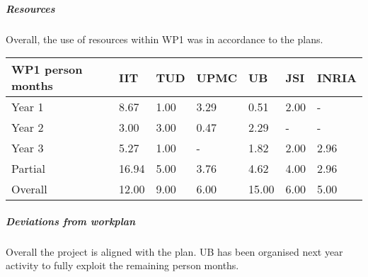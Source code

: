 

\subparagraph*{Resources}
Overall, the use of resources within WP1 was in accordance to the plans. 

\begin{center}
  \begin{tabular}{|C{1.5cm}|C{1.5cm}|C{1.5cm}|C{2cm}|C{2cm}|C{2cm}|C{2cm}|}
    \hline \footnotesize \textbf{WP1 person months}& \footnotesize
    \textbf{IIT}&\footnotesize \textbf{TUD}&\footnotesize \textbf{UPMC}&
    \footnotesize \textbf{UB} &\footnotesize \textbf{JSI} & \footnotesize \textbf{INRIA}\\
    \hline \footnotesize Year 1 & 8.67 &1.00 & 3.29 & 0.51 & 2.00 & -\\
    \hline \footnotesize Year 2 & 3.00 & 3.00 & 0.47 & 2.29 & - & - \\
    \hline \footnotesize Year 3 & 5.27 & 1.00 & - & 1.82 & 2.00 & 2.96 \\
	\hline \footnotesize Partial & 16.94 & 5.00 & 3.76 & 4.62 & 4.00 & 2.96 \\
	\hline
    \hline \footnotesize Overall & 12.00 & 9.00 & 6.00 & 15.00 & 6.00 & 5.00 \\
    \hline
  \end{tabular}
\end{center}

\subparagraph*{Deviations from workplan} 
Overall the project is aligned with the plan. UB has been organised next year activity to fully exploit the remaining person months.
